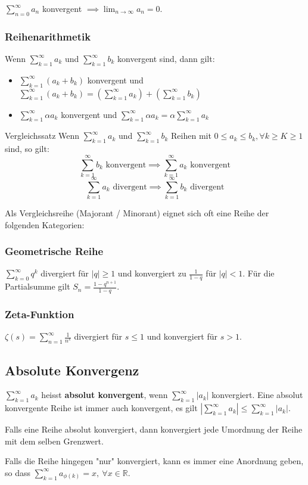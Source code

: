 \documentclass[a4paper,10pt]{article}
\def\limn{\lim_{n\to \infty}}
\def\sumk{\sum_{k=1}^\infty}
\def\sumn{\sum_{n=0}^\infty}
\def\R{\mathbb{R}}
\begin{document}
$\sumn a_n$ konvergent $\implies \limn a_n = 0$.

\subsubsection{Reihenarithmetik}
Wenn $\sumk a_k$ und $\sumk b_k$ konvergent sind, dann gilt:
\begin{itemize}
 \item $\sumk (a_k + b_k)$ konvergent und $\sumk (a_k + b_k) = \left( \sumk a_k \right) + \left( \sumk b_k \right)$
 \item $\sumk \alpha a_k$ konvergent und $\sumk \alpha a_k = \alpha \sumk a_k$
\end{itemize}


\begin{mainbox}{Vergleichssatz}
Wenn $\sumk a_k$ und $\sumk b_k$ Reihen mit $0 \le a_k \le b_k, \forall k \ge K \ge 1$ sind, so gilt:
$$\sumk b_k \text{ konvergent} \implies \sumk a_k \text{ konvergent}$$ 
$$\sumk a_k \text{ divergent} \implies \sumk b_k \text{ divergent}$$ 
\end{mainbox}

Als Vergleichsreihe (Majorant / Minorant) eignet sich oft eine Reihe der folgenden Kategorien:
\subsubsection{Geometrische Reihe} 
$\sum_{k=0}^\infty q^k$ divergiert für $|q| \ge 1$ und konvergiert zu $\frac{1}{1 - q}$ für $|q| < 1$. Für die Partialsumme gilt $S_n = \frac{1 - q^{n+1}}{1 - q}$.
\subsubsection{Zeta-Funktion}
$\zeta(s) = \sum_{n=1}^\infty \frac{1}{n^s}$ divergiert für $s \le 1$ und konvergiert für $s > 1$.

\subsection{Absolute Konvergenz}
$\sumk a_k$ heisst \textbf{absolut konvergent}, wenn $\sumk |a_k|$ konvergiert. Eine absolut konvergente Reihe ist immer auch konvergent, es gilt $|\sumk a_k| \le \sumk |a_k|$.

Falls eine Reihe absolut konvergiert, dann konvergiert jede Umordnung der Reihe mit dem selben Grenzwert.

Falls die Reihe hingegen "nur" konvergiert, kann es immer eine Anordnung geben, so dass $\sum_{k=1}^\infty a_{\phi(k)} = x, \ \forall x\in \R$.
\end{document}
